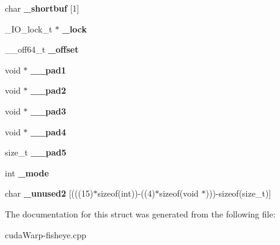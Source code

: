 \begin{DoxyCompactItemize}
\item 
char {\bfseries \+\_\+shortbuf} \mbox{[}1\mbox{]}\hypertarget{struct__IO__FILE_af16f2000a0ea3b992b41066e55d74950}{}\label{struct__IO__FILE_af16f2000a0ea3b992b41066e55d74950}

\item 
\+\_\+\+I\+O\+\_\+lock\+\_\+t $\ast$ {\bfseries \+\_\+lock}\hypertarget{struct__IO__FILE_a378991c1b521f52b72fc9d46a78c2033}{}\label{struct__IO__FILE_a378991c1b521f52b72fc9d46a78c2033}

\item 
\+\_\+\+\_\+off64\+\_\+t {\bfseries \+\_\+offset}\hypertarget{struct__IO__FILE_a6984cd80575532a12da307fd776cbe21}{}\label{struct__IO__FILE_a6984cd80575532a12da307fd776cbe21}

\item 
void $\ast$ {\bfseries \+\_\+\+\_\+pad1}\hypertarget{struct__IO__FILE_aaa6062479578913614dcc2d9f932db23}{}\label{struct__IO__FILE_aaa6062479578913614dcc2d9f932db23}

\item 
void $\ast$ {\bfseries \+\_\+\+\_\+pad2}\hypertarget{struct__IO__FILE_a09014bf2e7a14e2211203cc903e8b8e4}{}\label{struct__IO__FILE_a09014bf2e7a14e2211203cc903e8b8e4}

\item 
void $\ast$ {\bfseries \+\_\+\+\_\+pad3}\hypertarget{struct__IO__FILE_acff6c2dd23be04c10f128d9d27125b7b}{}\label{struct__IO__FILE_acff6c2dd23be04c10f128d9d27125b7b}

\item 
void $\ast$ {\bfseries \+\_\+\+\_\+pad4}\hypertarget{struct__IO__FILE_a77a46df832de16db7cd562d7f90b52f1}{}\label{struct__IO__FILE_a77a46df832de16db7cd562d7f90b52f1}

\item 
size\+\_\+t {\bfseries \+\_\+\+\_\+pad5}\hypertarget{struct__IO__FILE_a79b0d0bccbf23ce37069f9a8ca6297fd}{}\label{struct__IO__FILE_a79b0d0bccbf23ce37069f9a8ca6297fd}

\item 
int {\bfseries \+\_\+mode}\hypertarget{struct__IO__FILE_a5fcae29efb49dd2d3ea1fcd920daacfd}{}\label{struct__IO__FILE_a5fcae29efb49dd2d3ea1fcd920daacfd}

\item 
char {\bfseries \+\_\+unused2} \mbox{[}(((15)$\ast$sizeof(int))-\/((4)$\ast$sizeof(void $\ast$)))-\/sizeof(size\+\_\+t)\mbox{]}\hypertarget{struct__IO__FILE_a3ee58fb074a689a5e398aae71e44f21b}{}\label{struct__IO__FILE_a3ee58fb074a689a5e398aae71e44f21b}

\end{DoxyCompactItemize}


The documentation for this struct was generated from the following file\+:\begin{DoxyCompactItemize}
\item 
cuda\+Warp-\/fisheye.\+cpp\end{DoxyCompactItemize}
